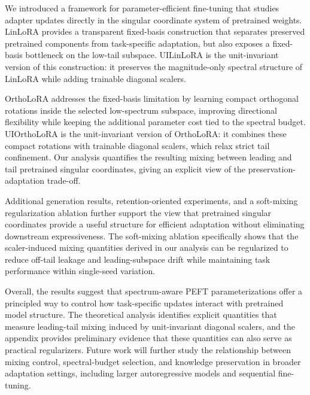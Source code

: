 We introduced a framework for parameter-efficient fine-tuning that studies adapter updates directly in the singular coordinate system of pretrained weights. LinLoRA provides a transparent fixed-basis construction that separates preserved pretrained components from task-specific adaptation, but also exposes a fixed-basis bottleneck on the low-tail subspace. UILinLoRA is the unit-invariant version of this construction: it preserves the magnitude-only spectral structure of LinLoRA while adding trainable diagonal scalers.

OrthoLoRA addresses the fixed-basis limitation by learning compact orthogonal rotations inside the selected low-spectrum subspace, improving directional flexibility while keeping the additional parameter cost tied to the spectral budget. UIOrthoLoRA is the unit-invariant version of OrthoLoRA: it combines these compact rotations with trainable diagonal scalers, which relax strict tail confinement. Our analysis quantifies the resulting mixing between leading and tail pretrained singular coordinates, giving an explicit view of the preservation-adaptation trade-off.

Additional generation results, retention-oriented experiments, and a
soft-mixing regularization ablation further support the view that pretrained
singular coordinates provide a useful structure for efficient adaptation
without eliminating downstream expressiveness. The soft-mixing ablation
specifically shows that the scaler-induced mixing quantities derived in our
analysis can be regularized to reduce off-tail leakage and leading-subspace
drift while maintaining task performance within single-seed variation.

Overall, the results suggest that spectrum-aware PEFT parameterizations offer
a principled way to control how task-specific updates interact with pretrained
model structure. The theoretical analysis identifies explicit quantities that
measure leading-tail mixing induced by unit-invariant diagonal scalers, and the
appendix provides preliminary evidence that these quantities can also serve as
practical regularizers. Future work will further study the relationship between mixing control, spectral-budget selection, and knowledge preservation in broader adaptation settings, including larger autoregressive models and sequential fine-tuning.
